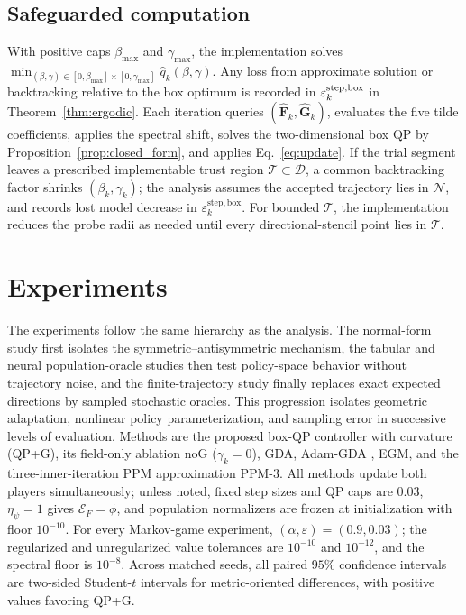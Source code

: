 \documentclass[journal]{IEEEtran}
\theoremstyle{remark}
\newcommand{\cD}{\mathcal{D}}
\newcommand{\cN}{\mathcal{N}}
\newcommand{\hatF}{\widehat{\boldsymbol{F}}}
\newcommand{\hatG}{\widehat{\boldsymbol{G}}}
\newcommand{\cE}{\mathcal{E}}
\begin{document}
	\subsection{Safeguarded computation}\label{subsec:safeguard}
	With positive caps $\beta_{\max}$ and $\gamma_{\max}$, the implementation solves $\min_{(\beta,\gamma)\in[0,\beta_{\max}]\times[0,\gamma_{\max}]}\hat q_{k}(\beta,\gamma)$.
	Any loss from approximate solution or backtracking relative to the box optimum is recorded in $\varepsilon_k^{\rm step,box}$ in Theorem~\ref{thm:ergodic}.
	Each iteration queries $(\hatF_k,\hatG_k)$, evaluates the five tilde coefficients, applies the spectral shift, solves the two-dimensional box QP by Proposition~\ref{prop:closed_form}, and applies Eq.~\eqref{eq:update}.
	If the trial segment leaves a prescribed implementable trust region $\mathcal T\subset\cD$, a common backtracking factor shrinks $(\beta_k,\gamma_k)$; the analysis assumes the accepted trajectory lies in $\cN$, and records lost model decrease in $\varepsilon_k^{\mathrm{step,box}}$.
	For bounded $\mathcal T$, the implementation reduces the probe radii as needed until every directional-stencil point lies in $\mathcal T$.
	
	\section{Experiments}\label{sec:experiments}
	
	The experiments follow the same hierarchy as the analysis.
	The normal-form study first isolates the symmetric--antisymmetric mechanism, the tabular and neural population-oracle studies then test policy-space behavior without trajectory noise, and the finite-trajectory study finally replaces exact expected directions by sampled stochastic oracles.
	This progression isolates geometric adaptation, nonlinear policy parameterization, and sampling error in successive levels of evaluation.
	Methods are the proposed box-QP controller with curvature (QP+G), its field-only ablation noG ($\gamma_k=0$), GDA, Adam-GDA \cite{KingmaBa2015Adam}, EGM, and the three-inner-iteration PPM approximation PPM-3.
	All methods update both players simultaneously; unless noted, fixed step sizes and QP caps are $0.03$, $\eta_\psi=1$ gives $\cE_F=\phi$, and population normalizers are frozen at initialization with floor $10^{-10}$.
	For every Markov-game experiment, $(\alpha,\varepsilon)=(0.9,0.03)$; the regularized and unregularized value tolerances are $10^{-10}$ and $10^{-12}$, and the spectral floor is $10^{-8}$.
	Across matched seeds, all paired $95\%$ confidence intervals are two-sided Student-$t$ intervals for metric-oriented differences, with positive values favoring QP+G.
	
\end{document}
